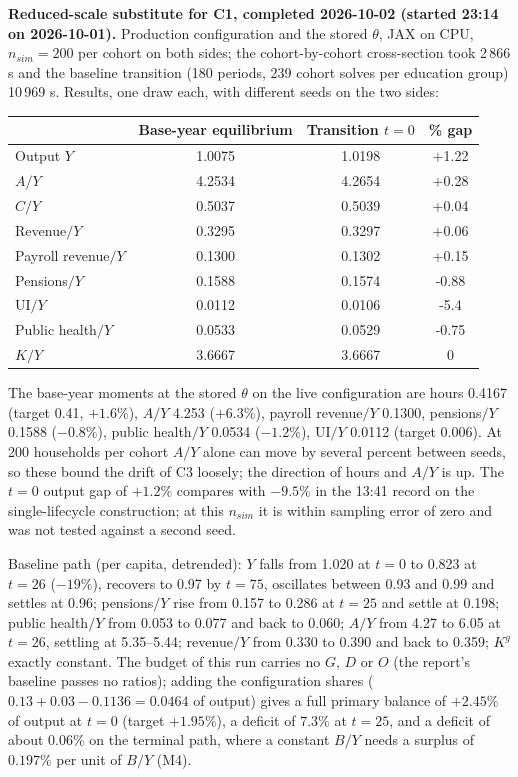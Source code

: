\textbf{Reduced-scale substitute for C1, completed 2026-10-02 (started 23:14 on 2026-10-01).} Production configuration and the stored $\theta$, JAX on CPU, $n_{sim} = 200$ per cohort on both sides; the cohort-by-cohort cross-section took 2\,866 s and the baseline transition (180 periods, 239 cohort solves per education group) 10\,969 s. Results, one draw each, with different seeds on the two sides:

\begin{center}\footnotesize
\begin{tabular}{@{}lS[table-format=1.4]S[table-format=1.4]S[table-format=+1.2]@{}}
\toprule
& {Base-year equilibrium} & {Transition $t = 0$} & {\% gap} \\
\midrule
Output $Y$ & 1.0075 & 1.0198 & +1.22 \\
$A/Y$ & 4.2534 & 4.2654 & +0.28 \\
$C/Y$ & 0.5037 & 0.5039 & +0.04 \\
Revenue$/Y$ & 0.3295 & 0.3297 & +0.06 \\
Payroll revenue$/Y$ & 0.1300 & 0.1302 & +0.15 \\
Pensions$/Y$ & 0.1588 & 0.1574 & -0.88 \\
UI$/Y$ & 0.0112 & 0.0106 & -5.4 \\
Public health$/Y$ & 0.0533 & 0.0529 & -0.75 \\
$K/Y$ & 3.6667 & 3.6667 & 0 \\
\bottomrule
\end{tabular}
\end{center}

The base-year moments at the stored $\theta$ on the live configuration are hours 0.4167 (target 0.41, $+1.6\%$), $A/Y$ 4.253 ($+6.3\%$), payroll revenue$/Y$ 0.1300, pensions$/Y$ 0.1588 ($-0.8\%$), public health$/Y$ 0.0534 ($-1.2\%$), UI$/Y$ 0.0112 (target 0.006). At 200 households per cohort $A/Y$ alone can move by several percent between seeds, so these bound the drift of C3 loosely; the direction of hours and $A/Y$ is up. The $t = 0$ output gap of $+1.2\%$ compares with $-9.5\%$ in the 13:41 record on the single-lifecycle construction; at this $n_{sim}$ it is within sampling error of zero and was not tested against a second seed.

Baseline path (per capita, detrended): $Y$ falls from 1.020 at $t = 0$ to 0.823 at $t = 26$ ($-19\%$), recovers to 0.97 by $t = 75$, oscillates between 0.93 and 0.99 and settles at 0.96; pensions$/Y$ rise from 0.157 to 0.286 at $t = 25$ and settle at 0.198; public health$/Y$ from 0.053 to 0.077 and back to 0.060; $A/Y$ from 4.27 to 6.05 at $t = 26$, settling at 5.35--5.44; revenue$/Y$ from 0.330 to 0.390 and back to 0.359; $K^g$ exactly constant. The budget of this run carries no $G$, $D$ or $O$ (the report's baseline passes no ratios); adding the configuration shares ($0.13 + 0.03 - 0.1136 = 0.0464$ of output) gives a full primary balance of $+2.45\%$ of output at $t = 0$ (target $+1.95\%$), a deficit of $7.3\%$ at $t = 25$, and a deficit of about $0.06\%$ on the terminal path, where a constant $B/Y$ needs a surplus of $0.197\%$ per unit of $B/Y$ (M4).

